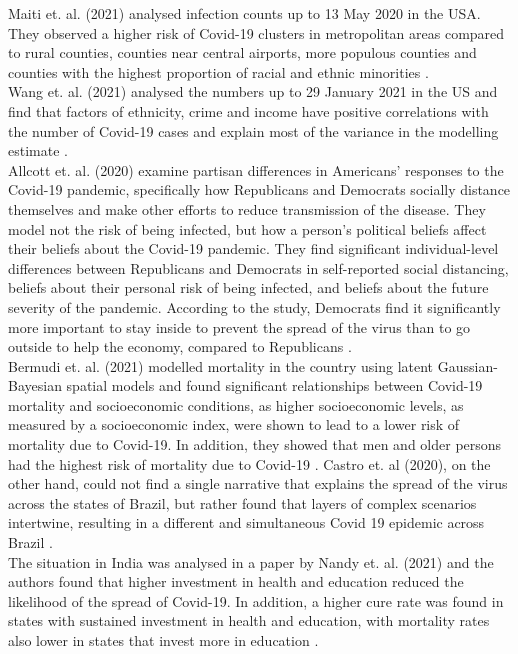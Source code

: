 Maiti et. al. (2021) analysed infection counts up to 13 May 2020 in the USA. They observed a higher risk of Covid-19 clusters in metropolitan areas compared to rural counties, counties near central airports, more populous counties and counties with the highest proportion of racial and ethnic minorities \autocite[][]{maiti2021exploring}. \\
Wang et. al. (2021) analysed the numbers up to 29 January 2021 in the US and find that factors of ethnicity, crime and income have positive correlations with the number of Covid-19 cases and explain most of the variance in the modelling estimate \autocite[][]{wang2021spatiotemporal}. \\
Allcott et. al. (2020) examine partisan differences in Americans' responses to the Covid-19 pandemic, specifically how Republicans and Democrats socially distance themselves and make other efforts to reduce transmission of the disease. They model not the risk of being infected, but how a person's political beliefs affect their beliefs about the Covid-19 pandemic. They find significant individual-level differences between Republicans and Democrats in self-reported social distancing, beliefs about their personal risk of being infected, and beliefs about the future severity of the pandemic. According to the study, Democrats find it significantly more important to stay inside to prevent the spread of the virus than to go outside to help the economy, compared to Republicans \autocite[][]{allcott2020polarization}. \\
Bermudi et. al. (2021) modelled mortality in the country using latent Gaussian-Bayesian spatial models and found significant relationships between Covid-19 mortality and socioeconomic conditions, as higher socioeconomic levels, as measured by a socioeconomic index, were shown to lead to a lower risk of mortality due to Covid-19. In addition, they showed that men and older persons had the highest risk of mortality due to Covid-19 \autocite[][]{bermudi2021spatiotemporal}. Castro et. al (2020), on the other hand, could not find a single narrative that explains the spread of the virus across the states of Brazil, but rather found that layers of complex scenarios intertwine, resulting in a different and simultaneous Covid 19 epidemic across Brazil \autocite[][]{castro2021spatiotemporal}. \\
The situation in India was analysed in a paper by Nandy et. al. (2021) and the authors found that higher investment in health and education reduced the likelihood of the spread of Covid-19. In addition, a higher cure rate was found in states with sustained investment in health and education, with mortality rates also lower in states that invest more in education \autocite[][]{nandy2021managing}. \\
